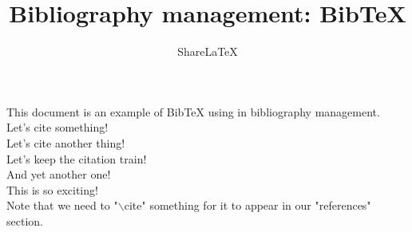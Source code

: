 \documentclass[a4paper,10pt]{article}
\title{Bibliography management: BibTeX}
\author{Share\LaTeX}
\begin{document}
\maketitle
This document is an example of BibTeX using in bibliography management.\\
Let's cite something! \cite{sturmfels_algorithms_2008}\\
Let's cite another thing! \cite{derksen_polynomial_2000}\\
Let's keep the citation train! \cite{gao_zero-sum_2006} \\
And yet another one! \cite{sezer_sharpening_2002} \\
This is so exciting! \cite{schmid_finite_1991}\\
Note that we need to "$\backslash$cite" something for it to appear in our "references" section.

\medskip


\end{document}

